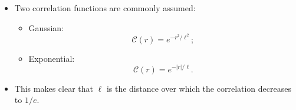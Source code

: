 \documentclass[11pt, oneside]{article}
\begin{document}
\begin{itemize}
	\item Two correlation functions are commonly assumed:
	\begin{itemize}
		\item Gaussian:
		\begin{equation}
			\label{e:acf_g}
			\mathcal{C}(r) = e^{-r^2/\ell^2};
		\end{equation}
		\item Exponential:
		\begin{equation}
			\label{e:acf_e}
			\mathcal{C}(r) = e^{-|r|/\ell}.
		\end{equation}
	\end{itemize}
	\item[$\Rightarrow$] This makes clear that $\ell$ is the distance over which the correlation decreases to $1/e$.
\end{itemize}

\end{document}
